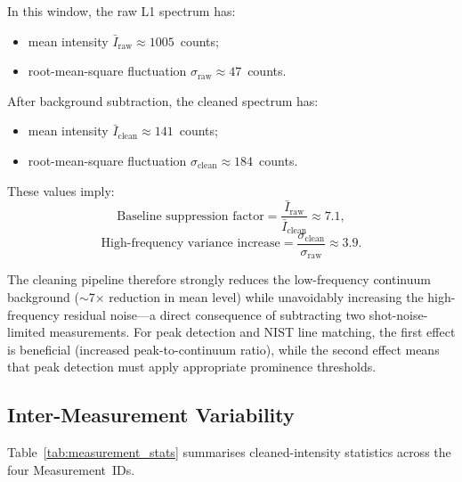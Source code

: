 \documentclass[a4paper,twocolumn,10pt]{article}
\begin{document}
In this window, the raw L1 spectrum has:
\begin{itemize}[nosep,leftmargin=*]
  \item mean intensity $\bar{I}_{\text{raw}} \approx 1005$~counts;
  \item root-mean-square fluctuation
    $\sigma_{\text{raw}} \approx 47$~counts.
\end{itemize}

After background subtraction, the cleaned spectrum has:
\begin{itemize}[nosep,leftmargin=*]
  \item mean intensity $\bar{I}_{\text{clean}} \approx 141$~counts;
  \item root-mean-square fluctuation
    $\sigma_{\text{clean}} \approx 184$~counts.
\end{itemize}

These values imply:
\begin{equation}
\text{Baseline suppression factor} =
  \frac{\bar{I}_{\text{raw}}}{\bar{I}_{\text{clean}}} \approx 7.1,
\end{equation}
\begin{equation}
\text{High-frequency variance increase} =
  \frac{\sigma_{\text{clean}}}{\sigma_{\text{raw}}} \approx 3.9.
\end{equation}

The cleaning pipeline therefore strongly reduces the low-frequency
continuum background ($\sim$7$\times$ reduction in mean level) while
unavoidably increasing the high-frequency residual noise---a direct
consequence of subtracting two shot-noise-limited measurements.
For peak detection and NIST line matching, the first effect is
beneficial (increased peak-to-continuum ratio), while the second
effect means that peak detection must apply appropriate prominence
thresholds.

\subsection{Inter-Measurement Variability}

Table~\ref{tab:measurement_stats} summarises cleaned-intensity
statistics across the four Measurement~IDs.
\end{document}
